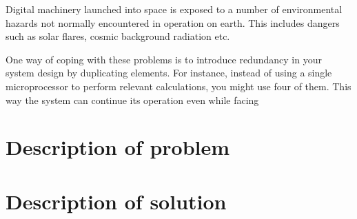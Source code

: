 Digital machinery launched into space is exposed to a number of
environmental hazards not normally encountered in operation on
earth. This includes dangers such as solar flares, cosmic background
radiation etc.\cite{nasa}

One way of coping with these problems is to introduce redundancy in
your system design by duplicating elements. For instance, instead of
using a single microprocessor to perform relevant calculations, you
might use four of them. This way the system can continue its operation
even while facing


\section{Description of problem}



\section{Description of solution}
